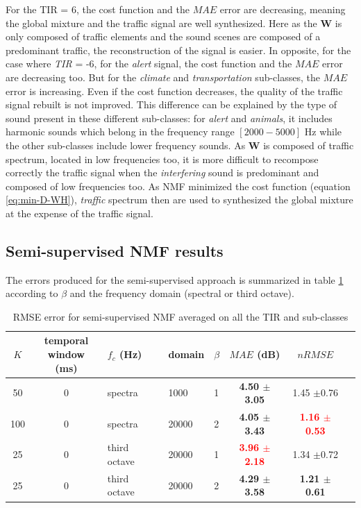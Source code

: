 \documentclass[twocolumn,a4paper,10pt]{article}
\begin{document}
For the TIR = 6, the cost function and the $MAE$ error are decreasing, meaning the global mixture and the traffic signal are well synthesized. Here as the $\mathbf{W}$ is only composed of traffic elements and the sound scenes are composed of a predominant traffic, the reconstruction of the signal is easier. In opposite, for the case where \textit{TIR} = -6, for the \textit{alert} signal, the cost function and the $MAE$ error are decreasing too. But for the \textit{climate} and \textit{transportation} sub-classes, the $MAE$ error is increasing. Even if the cost function decreases, the quality of the traffic signal rebuilt is not improved. This difference can be explained by the type of sound present in these different sub-classes: for \textit{alert} and \textit{animals}, it includes harmonic sounds which belong in the frequency range $\left[2000-5000\right]$ Hz while the other sub-classes include lower frequency sounds.  As $\mathbf{W}$ is composed of traffic spectrum, located in low frequencies too, it is more difficult to recompose correctly the traffic signal when the \textit{interfering} sound is predominant and composed of low frequencies too. As NMF minimized the cost function (equation \ref{eq:min-D-WH}), \textit{traffic} spectrum then are used to synthesized the global mixture at the expense of the traffic signal.

\subsection{Semi-supervised NMF results}

The errors produced for the semi-supervised approach is summarized in table \ref{tab:results_semi_supervised} according to $\beta$ and the frequency domain (spectral or third octave).\\

\begin{table}
\centering
\begin{tabular}{cclllccc}
$K$ & \shortstack{temporal\\window (ms)} & $f_c$ (Hz) & domain & $\beta$ & $MAE$ (dB) & $nRMSE$ \\
\hline
 50 & 0 & spectra &  1000 & 1 & \textbf{4.50 $\pm$3.05} & 1.45 $\pm$0.76 \\
100 & 0 & spectra & 20000 & 2 & \textbf{4.05 $\pm$3.43} & \textbf{\textcolor{red}{1.16 $\pm$0.53}} \\
 25 & 0 & third octave & 20000 & 1 & \textbf{\textcolor{red}{3.96 $\pm$2.18}} & 1.34 $\pm$0.72 \\
 25 & 0 & third octave & 20000 & 2 & \textbf{4.29 $\pm$3.58} & \textbf{1.21 $\pm$0.61}
\end{tabular}
\caption{RMSE error for semi-supervised NMF averaged on all the TIR and sub-classes}
\label{tab:results_semi_supervised}
\end{table}
\end{document}
